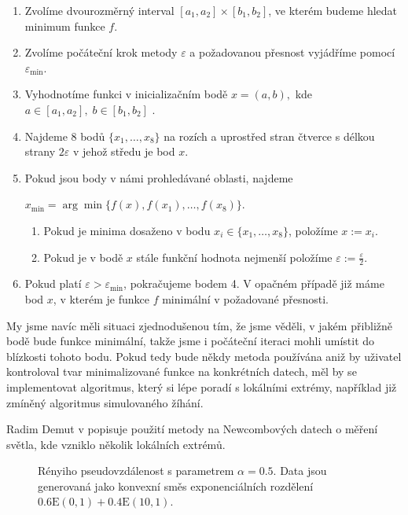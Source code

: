 \begin{enumerate}
	\item Zvolíme dvourozměrný interval $[a_1,a_2]\times [b_1,b_2]$, ve kterém budeme hledat minimum funkce $f$.
	\item Zvolíme počáteční krok metody $\varepsilon$ a požadovanou přesnost vyjádříme pomocí $\varepsilon_{\min}$.
	\item Vyhodnotíme funkci v inicializačním bodě $x = (a,b),$ kde $a \in [a_1,a_2],\; b \in [b_1,b_2]$	.
	\item Najdeme 8 bodů $\lbrace x_1,\ldots,x_8 \rbrace$ na rozích a uprostřed stran čtverce s délkou strany $2\varepsilon$ v jehož středu je bod $x$.	
	\item Pokud jsou body v námi prohledávané oblasti, najdeme 
		
	$x_{\min} = \arg\min \lbrace f(x),f(x_1),\ldots,f(x_8)\rbrace$.
		\begin{enumerate}
			\item Pokud je minima dosaženo v bodu $x_i \in \lbrace x_1,\ldots,x_8 \rbrace$, položíme $x := x_i$.
			\item Pokud je v bodě $x$ stále funkční hodnota nejmenší položíme $\varepsilon:= \frac{\varepsilon}{2}$.
		\end{enumerate}		
	\item Pokud platí $\varepsilon > \varepsilon_{\min}$, pokračujeme bodem 4. V opačném případě již máme bod $x$, v kterém je funkce $f$ minimální v požadované přesnosti.
\end{enumerate}

My jsme navíc měli situaci zjednodušenou tím, že jsme věděli, v jakém přibližně bodě bude funkce minimální, takže jsme i počáteční iteraci mohli umístit do blízkosti tohoto bodu. Pokud tedy bude někdy metoda používána aniž by uživatel kontroloval tvar minimalizované funkce na konkrétních datech, měl by se implementovat algoritmus, který si lépe poradí s lokálními extrémy, například již zmíněný algoritmus simulovaného žíhání.

Radim Demut v \cite{Demut2010} popisuje použití metody na Newcombových datech o měření světla, kde vzniklo několik lokálních extrémů.

\begin{figure}[htb!]
	\begin{center}
		\caption{Rényiho pseudovzdálenost s parametrem $\alpha = 0.5$. Data jsou generovaná jako konvexní směs exponenciálních rozdělení $0.6\mathrm{E}(0,1) + 0.4\mathrm{E}(10,1)$.}
		\label{fig-distanceE}
	\end{center}
\end{figure}

